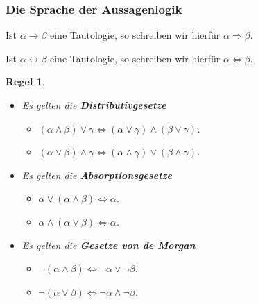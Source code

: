 \documentclass[hyperref={pdfpagelabels=false}]{beamer}
\theoremstyle{plain}%
\newtheorem*{regel}{Regel}
\theoremstyle{definition}
\theoremstyle{remark}
\begin{document}
\begin{frame}
\frametitle{Die Sprache der Aussagenlogik}

\begin{definition} 
Ist $\alpha \rightarrow \beta$ eine Tautologie, so 
schreiben wir hierfür $\alpha \Longrightarrow \beta$.

Ist $\alpha \leftrightarrow \beta$ eine Tautologie, so schreiben wir hierfür $\alpha \iff \beta$.
\end{definition}

\pause 

\begin{regel} 
\begin{itemize}
\item<3-> Es gelten die \textbf{Distributivgesetze}

\begin{itemize}
\item $(\alpha \wedge \beta) \vee \gamma \iff (\alpha \vee \gamma) \wedge (\beta \vee \gamma)$.
\item $(\alpha \vee \beta) \wedge \gamma \iff (\alpha \wedge \gamma) \vee (\beta \wedge \gamma)$.
\end{itemize}
\item<4-> Es gelten die \textbf{Absorptionsgesetze}

\begin{itemize}
\item $\alpha \vee (\alpha \wedge \beta) \iff \alpha $.
\item $\alpha \wedge (\alpha \vee \beta)  \iff \alpha $.
\end{itemize}

\item<5-> Es gelten die \textbf{Gesetze von de Morgan}

\begin{itemize}
\item $\neg(\alpha \wedge \beta)  \iff  \neg \alpha \vee \neg \beta $.
\item $\neg(\alpha \vee \beta)  \iff \neg \alpha \wedge \neg \beta $.
\end{itemize}
\end{itemize}
\end{regel}

\end{frame}
\end{document}
